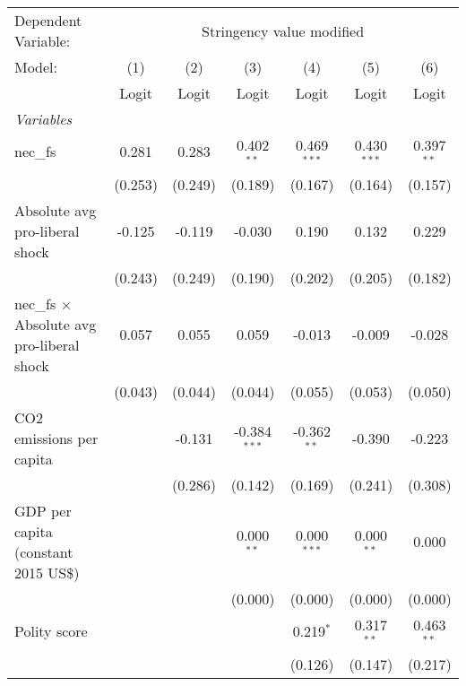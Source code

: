 
\begingroup
\centering
\begin{tabular}{lcccccc}
   \toprule
   Dependent Variable: & \multicolumn{6}{c}{Stringency value modified}\\
   Model:                                            & (1)     & (2)     & (3)            & (4)           & (5)           & (6)\\  
                                                     &  Logit  & Logit   & Logit          & Logit         & Logit         & Logit\\  
   \midrule
   \emph{Variables}\\
   nec\_fs                                           & 0.281   & 0.283   & 0.402$^{**}$   & 0.469$^{***}$ & 0.430$^{***}$ & 0.397$^{**}$\\   
                                                     & (0.253) & (0.249) & (0.189)        & (0.167)       & (0.164)       & (0.157)\\   
   Absolute avg pro-liberal shock                    & -0.125  & -0.119  & -0.030         & 0.190         & 0.132         & 0.229\\   
                                                     & (0.243) & (0.249) & (0.190)        & (0.202)       & (0.205)       & (0.182)\\   
   nec\_fs $\times$ Absolute avg pro-liberal shock   & 0.057   & 0.055   & 0.059          & -0.013        & -0.009        & -0.028\\   
                                                     & (0.043) & (0.044) & (0.044)        & (0.055)       & (0.053)       & (0.050)\\   
   CO2 emissions per capita                          &         & -0.131  & -0.384$^{***}$ & -0.362$^{**}$ & -0.390        & -0.223\\   
                                                     &         & (0.286) & (0.142)        & (0.169)       & (0.241)       & (0.308)\\   
   GDP per capita (constant 2015 US\$)               &         &         & 0.000$^{**}$   & 0.000$^{***}$ & 0.000$^{**}$  & 0.000\\   
                                                     &         &         & (0.000)        & (0.000)       & (0.000)       & (0.000)\\   
   Polity score                                      &         &         &                & 0.219$^{*}$   & 0.317$^{**}$  & 0.463$^{**}$\\   
                                                     &         &         &                & (0.126)       & (0.147)       & (0.217)\\   

\end{tabular}
